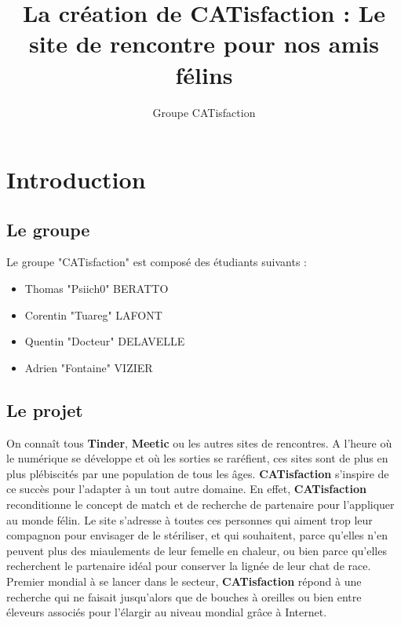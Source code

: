 \documentclass{article}
\author{Groupe CATisfaction}
\title{La création de CATisfaction : Le site de rencontre pour nos amis félins}
\begin{document}
\maketitle
\newpage

\tableofcontents
\newpage


\section{Introduction}

\subsection{Le groupe}
Le groupe "CATisfaction" est composé des étudiants suivants : 
\begin{itemize}
\item Thomas "Psiich0" BERATTO 
\item Corentin "Tuareg" LAFONT
\item Quentin "Docteur" DELAVELLE
\item Adrien "Fontaine" VIZIER
\end{itemize}

\subsection{Le projet}
On connaît tous \textbf{Tinder}, \textbf{Meetic} ou les autres sites de rencontres. A l'heure où le numérique se développe et où les sorties se raréfient, ces sites sont de plus en plus plébiscités par une population de tous les âges. \textbf{CATisfaction} s'inspire de ce succès pour l'adapter à un tout autre domaine. En effet, \textbf{CATisfaction} reconditionne le concept de match et de recherche de partenaire pour l'appliquer au monde félin. Le site s'adresse à toutes ces personnes qui aiment trop leur compagnon pour envisager de le stériliser, et qui souhaitent, parce qu'elles n'en peuvent plus des miaulements de leur femelle en chaleur, ou bien parce qu'elles recherchent le partenaire idéal pour conserver la lignée de leur chat de race.
\newline
\newline
Premier mondial à se lancer dans le secteur, \textbf{CATisfaction} répond à une recherche qui ne faisait jusqu'alors que de bouches à oreilles ou bien entre éleveurs associés pour l'élargir au niveau mondial grâce à Internet.
\end{document}
